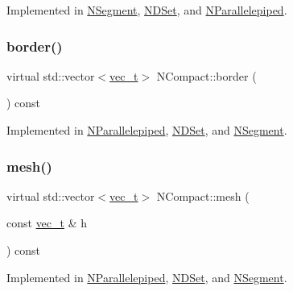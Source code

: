 Implemented in \mbox{\hyperlink{class_n_segment_a2fbe9d64e08f8aaa60d09ba8fe0ca2ba}{N\+Segment}}, \mbox{\hyperlink{class_n_d_set_a683386499ad6a9de65e0197f2846d8de}{N\+D\+Set}}, and \mbox{\hyperlink{class_n_parallelepiped_a57517e96bd3bc757cfa4e4d1d2768450}{N\+Parallelepiped}}.

\mbox{\label{class_n_compact_af7acc50099e80fc13ce32c97e6857308}} 
\subsubsection{\texorpdfstring{border()}{border()}}
{\footnotesize\ttfamily virtual std\+::vector$<$\mbox{\hyperlink{_n_vector_8h_a0a2cfc67e738a3d73e4f12098c4c07f6}{vec\+\_\+t}}$>$ N\+Compact\+::border (\begin{DoxyParamCaption}{ }\end{DoxyParamCaption}) const\hspace{0.3cm}{\ttfamily [pure virtual]}}



Implemented in \mbox{\hyperlink{class_n_parallelepiped_a6cc531927e40a95b48923b56406206d3}{N\+Parallelepiped}}, \mbox{\hyperlink{class_n_d_set_a3020476b78835439f6474845d30f00ff}{N\+D\+Set}}, and \mbox{\hyperlink{class_n_segment_a0ef102ed1c0751ae4a9a2e52bf0736da}{N\+Segment}}.

\mbox{\label{class_n_compact_ad4cdc60c75ca433c63f44ec13063e2fe}} 
\subsubsection{\texorpdfstring{mesh()}{mesh()}}
{\footnotesize\ttfamily virtual std\+::vector$<$\mbox{\hyperlink{_n_vector_8h_a0a2cfc67e738a3d73e4f12098c4c07f6}{vec\+\_\+t}}$>$ N\+Compact\+::mesh (\begin{DoxyParamCaption}\item[{const \mbox{\hyperlink{_n_vector_8h_a0a2cfc67e738a3d73e4f12098c4c07f6}{vec\+\_\+t}} \&}]{h }\end{DoxyParamCaption}) const\hspace{0.3cm}{\ttfamily [pure virtual]}}



Implemented in \mbox{\hyperlink{class_n_parallelepiped_a0f9ba9f6cab5d2c9472776e69f9aa78d}{N\+Parallelepiped}}, \mbox{\hyperlink{class_n_d_set_ae57fe6ad1422876fa4256a28c3a26a13}{N\+D\+Set}}, and \mbox{\hyperlink{class_n_segment_ad89a4122b800b15f465f5ca776394721}{N\+Segment}}.



